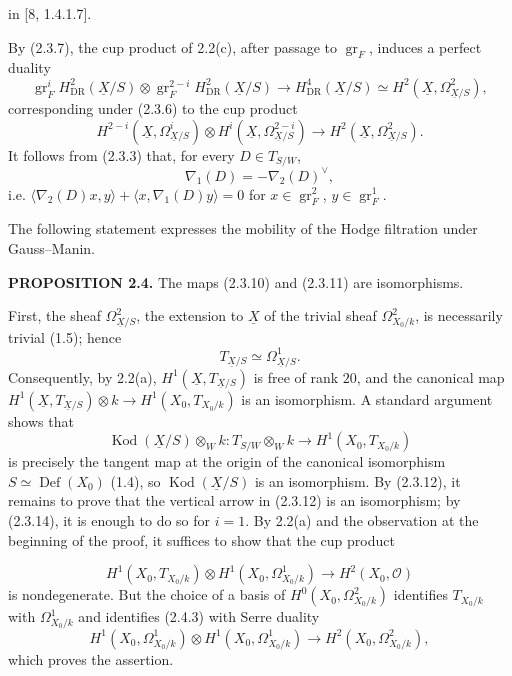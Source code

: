 \documentclass[10pt]{article}
\newcommand{\UX}{\underline{X}}
\begin{document}
in [8, 1.4.1.7].

By (2.3.7), the cup product of 2.2(c), after passage to $\operatorname{gr}_F$, induces a perfect duality
\begin{equation}\tag{2.3.13}
\operatorname{gr}^i_FH^2_{\mathrm{DR}}(\UX/S)\otimes
\operatorname{gr}^{2-i}_FH^2_{\mathrm{DR}}(\UX/S)
\longrightarrow H^4_{\mathrm{DR}}(\UX/S)\simeq H^2(\UX,\Omega^2_{\UX/S}),
\end{equation}
corresponding under (2.3.6) to the cup product
\[
H^{2-i}(\UX,\Omega^i_{\UX/S})\otimes H^i(\UX,\Omega^{2-i}_{\UX/S})
\longrightarrow H^2(\UX,\Omega^2_{\UX/S}).
\]
It follows from (2.3.3) that, for every $D\in T_{S/W}$,
\begin{equation}\tag{2.3.14}
\nabla_1(D)=-\nabla_2(D)^\vee,
\end{equation}
i.e. $\langle\nabla_2(D)x,y\rangle+\langle x,\nabla_1(D)y\rangle=0$ for $x\in\operatorname{gr}^2_F$, $y\in\operatorname{gr}^1_F$.

The following statement expresses the mobility of the Hodge filtration under Gauss--Manin.

\noindent\textbf{PROPOSITION 2.4.} The maps (2.3.10) and (2.3.11) are isomorphisms.

First, the sheaf $\Omega^2_{\UX/S}$, the extension to $\UX$ of the trivial sheaf $\Omega^2_{X_0/k}$, is necessarily trivial (1.5); hence
\begin{equation}\tag{2.4.1}
T_{\UX/S}\simeq\Omega^1_{\UX/S}.
\end{equation}
Consequently, by 2.2(a), $H^1(\UX,T_{\UX/S})$ is free of rank $20$, and the canonical map $H^1(\UX,T_{\UX/S})\otimes k\to H^1(X_0,T_{X_0/k})$ is an isomorphism. A standard argument shows that
\begin{equation}\tag{2.4.2}
\operatorname{Kod}(\UX/S)\otimes_Wk:T_{S/W}\otimes_Wk\longrightarrow H^1(X_0,T_{X_0/k})
\end{equation}
is precisely the tangent map at the origin of the canonical isomorphism $S\simeq\operatorname{Def}(X_0)$ (1.4), so $\operatorname{Kod}(\UX/S)$ is an isomorphism. By (2.3.12), it remains to prove that the vertical arrow in (2.3.12) is an isomorphism; by (2.3.14), it is enough to do so for $i=1$. By 2.2(a) and the observation at the beginning of the proof, it suffices to show that the cup product
\newpage
\setcounter{footnote}{0}
\fontsize{10.2pt}{12.04pt}\selectfont

\begin{equation}\tag{2.4.3}
H^1(X_0,T_{X_0/k})\otimes H^1(X_0,\Omega^1_{X_0/k})
\longrightarrow H^2(X_0,\mathcal O)
\end{equation}
is nondegenerate. But the choice of a basis of $H^0(X_0,\Omega^2_{X_0/k})$ identifies $T_{X_0/k}$ with $\Omega^1_{X_0/k}$ and identifies (2.4.3) with Serre duality
\[
H^1(X_0,\Omega^1_{X_0/k})\otimes H^1(X_0,\Omega^1_{X_0/k})
\longrightarrow H^2(X_0,\Omega^2_{X_0/k}),
\]
which proves the assertion.
\end{document}
